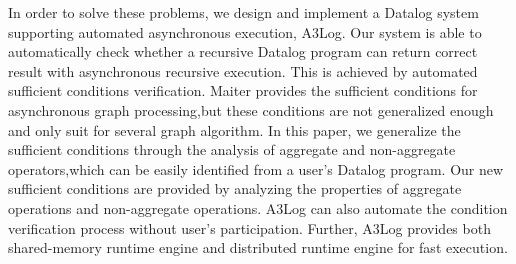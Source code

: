 In order to solve these problems, we design and implement a Datalog system supporting automated asynchronous execution, A3Log. Our system is able to automatically check whether a recursive Datalog program can return correct result with asynchronous recursive execution. This is achieved by automated sufficient conditions verification. Maiter \cite{} provides the sufficient conditions for asynchronous graph processing,but these conditions are not generalized enough and only suit for several graph algorithm. In this paper, we generalize the sufficient conditions through the analysis of aggregate and non-aggregate operators,which can be easily identified from a user's Datalog program. %
Our new sufficient conditions are provided by analyzing the properties of aggregate operations and non-aggregate operations. A3Log can also automate the condition verification process without user's participation. Further, A3Log provides both shared-memory runtime engine and distributed runtime engine for fast execution.

